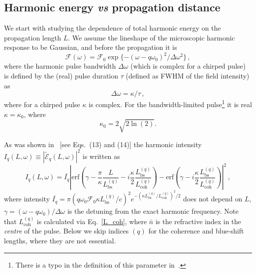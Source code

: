 \subsection{Harmonic energy \textit{vs} propagation distance} 
%
We start with studying the dependence of total harmonic energy on the propagation length $L$. We assume the lineshape of the microscopic harmonic response to be Gaussian, and before the propagation it is
\begin{equation}
\mathcal{F} (\omega)=\mathcal{F}_0 \exp\{ -(\omega- q \omega_0)^2/ \Delta \omega^2 \}  \, ,
\label{Gauss}
\end{equation}
where the harmonic pulse bandwidth $\Delta \omega$ (which is complex for a chirped pulse) is defined by the (real) pulse duration $\tau$ (defined as FWHM of the field intensity) as
\begin{equation}
\Delta \omega = \kappa / \tau \, ,
\label{kappa}
\end{equation}
where for a chirped pulse $\kappa$ is complex. For the bandwidth-limited pulse\footnote{There is a typo in the definition of this parameter in~\cite{KhokhlovaStrelkov}.} it is real $\kappa=\kappa_0$, where
\begin{equation}
\kappa_0 = 2\sqrt{ 2 \ln(2)} .   
\label{kappa0}
\end{equation}

As was shown in~\cite{KhokhlovaStrelkov} [see Eqs.~(13) and (14)] the harmonic intensity $I_q(L, \omega) \equiv \left | \tilde{\mathcal{E}}_q (L, \omega) \right |^2$ is written as
\begin{equation}
I_q(L, \omega) = \overline{I_q}
\left|
\mathrm{erf} \left( \gamma -\frac{\pi}{\kappa}\frac{L}{L_\mathrm{bs}^{(q)}} - i \frac{\kappa}{2}\frac{L_\mathrm{bs}^{(q)}}{L_\mathrm{coh}^{(q)}} \right) 
-
\mathrm{erf} \left( \gamma - i \frac{\kappa}{2}\frac{L_\mathrm{bs}^{(q)}}{L_\mathrm{coh}^{(q)}} \right) 
\right|^2 \, ,
\label{int_theory}
\end{equation}
where intensity $\overline{I_q}= \pi (q\omega_0 \mathcal{F}_0 \kappa L_\mathrm{bs}^{(q)}/ c)^2 e^{-(\kappa  L_\mathrm{bs}^{(q)} / L_\mathrm{coh}^{(q)})^2/2}$ does not depend on $L$, $\gamma=(\omega-q\omega_0)/\Delta \omega$ is the detuning from the exact harmonic frequency. Note that $L_\mathrm{coh}^{(q)}$ is calculated via Eq.~\eqref{L_coh}, where $\bar n$ is the refractive index in the {\it centre} of the pulse. Below we skip indices $(q)$ for the coherence and blue-shift lengths, where they are not essential. 

